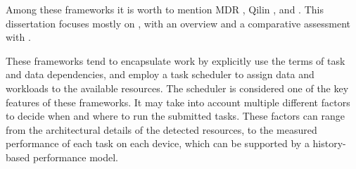 \documentclass[main.tex]{subfiles}
\begin{document}
Among these frameworks it is worth to mention MDR \cite{linderman2008merge}, Qilin \cite{luk2009qilin}, \starpu \cite{augonnet2011starpu} and \gama \cite{joao2012gama}. This dissertation focuses mostly on \starpu, with an overview and a comparative assessment with \gama.

These frameworks tend to encapsulate work by explicitly use the terms of task and data dependencies, and employ a task scheduler to assign data and workloads to the available resources.
The scheduler is considered one of the key features of these  frameworks. It may take into account multiple different factors to decide when and where to run the submitted tasks. These factors can range from the architectural details of the detected resources, to the measured performance of each task on each device, which can be supported by a history-based performance model.



\end{document}
